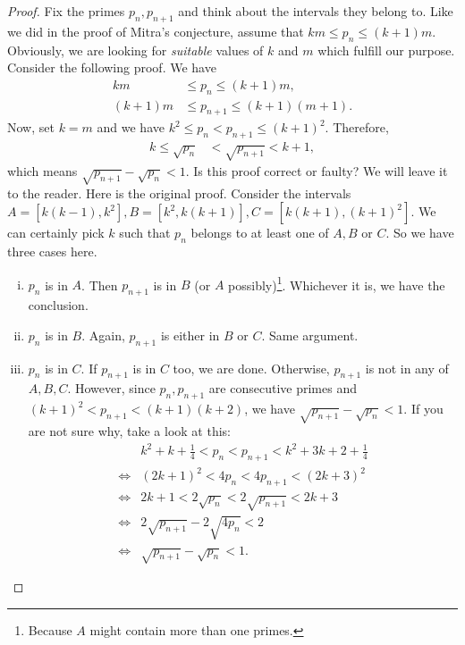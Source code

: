\documentclass{subfile}
\begin{document}
	\begin{proof}
		Fix the primes $p_n,p_{n+1}$ and think about the intervals they belong to. Like we did in the proof of Mitra's conjecture, assume that $km \leq p_n\leq (k+1)m$. Obviously, we are looking for \textit{suitable} values of $k$ and $m$ which fulfill our purpose. Consider the following proof. We have
			\begin{align*}
				km & \leq p_n \leq (k+1)m,\\
				(k+1)m&\leq p_{n+1}\leq(k+1)(m+1).
			\end{align*}
		Now, set $k=m$ and we have $k^2\leq p_n<p_{n+1}\leq(k+1)^2$. Therefore,
			\begin{align*}
				k\leq \sqrt{p_n}& <\sqrt{p_{n+1}}<k+1,
			\end{align*}
		which means $\sqrt{p_{n+1}}-\sqrt{p_n} < 1$. 
		Is this proof correct or faulty? We will leave it to the reader. Here is the original proof. Consider the intervals $A=[k(k-1),k^2],B=[k^2,k(k+1)],C=[k(k+1),(k+1)^2]$. We can certainly pick $k$ such that $p_n$ belongs to at least one of $A,B$ or $C$. So we have three cases here.
			\begin{enumerate}[i.]
				\item $p_n$ is in $A$. Then $p_{n+1}$ is in $B$ (or $A$ possibly)\footnote{Because $A$ might contain more than one primes.}. Whichever it is, we have the conclusion.
				\item $p_n$ is in $B$. Again, $p_{n+1}$ is either in $B$ or $C$. Same argument.
				\item $p_n$ is in $C$. If $p_{n+1}$ is in $C$ too, we are done. Otherwise, $p_{n+1}$ is not in any of $A,B,C$. However, since $p_n,p_{n+1}$ are consecutive primes and $(k+1)^2<p_{n+1}<(k+1)(k+2)$, we have $\sqrt{p_{n+1}}-\sqrt{p_n}<1$. If you are not sure why, take a look at this:
					\begin{align*}
						&k^2+k+\frac{1}{4}  < p_n < p_{n+1}< k^2+3k+2+\frac{1}{4}\\
						\iff & (2k+1)^2 < 4p_n<4p_{n+1} < (2k+3)^2\\
						\iff & 2k+1 < 2\sqrt{p_n}<2\sqrt{p_{n+1}}<2k+3\\
						\iff& 2\sqrt{p_{n+1}}-2\sqrt{4p_n} < 2\\
						\iff &\sqrt{p_{n+1}}-\sqrt{p_n} <1.
					\end{align*}
			\end{enumerate}
	\end{proof}
	
	
\end{document}

